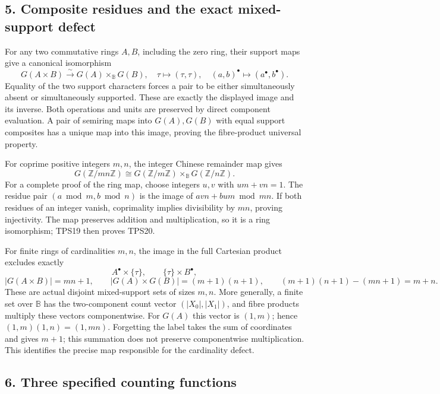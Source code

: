 \documentclass[
  10pt,
]{article}
\begin{document}
\subsection{5. Composite residues and the exact mixed-support
defect}\label{composite-residues-and-the-exact-mixed-support-defect}

For any two commutative rings \(A,B\), including the zero ring, their
support maps give a canonical isomorphism \[
\boxed{G(A\times B)\xrightarrow{\sim}G(A)\times_{\mathbb B}G(B),
\quad \tau\mapsto(\tau,\tau),\quad(a,b)^\bullet\mapsto(a^\bullet,b^\bullet).}
\tag{TPS19}
\] Equality of the two support characters forces a pair to be either
simultaneously absent or simultaneously supported. These are exactly the
displayed image and its inverse. Both operations and units are preserved
by direct component evaluation. A pair of semiring maps into
\(G(A),G(B)\) with equal support composites has a unique map into this
image, proving the fibre-product universal property.

For coprime positive integers \(m,n\), the integer Chinese remainder map
gives \[
\boxed{G(\mathbb Z/mn\mathbb Z)
\cong G(\mathbb Z/m\mathbb Z)\times_{\mathbb B}G(\mathbb Z/n\mathbb Z).}
\tag{TPS20}
\] For a complete proof of the ring map, choose integers \(u,v\) with
\(um+vn=1\). The residue pair \((a\bmod m,b\bmod n)\) is the image of
\(a v n+b u m\bmod mn\). If both residues of an integer vanish,
coprimality implies divisibility by \(mn\), proving injectivity. The map
preserves addition and multiplication, so it is a ring isomorphism;
TPS19 then proves TPS20.

For finite rings of cardinalities \(m,n\), the image in the full
Cartesian product excludes exactly \[
A^\bullet\times\{\tau\},\qquad \{\tau\}\times B^\bullet,
\] \[
|G(A\times B)|=mn+1,\qquad
|G(A)\times G(B)|=(m+1)(n+1),
\qquad (m+1)(n+1)-(mn+1)=m+n.
\tag{TPS21}
\] These are actual disjoint mixed-support sets of sizes \(m,n\). More
generally, a finite set over \(\mathbb B\) has the two-component count
vector \((|X_0|,|X_1|)\), and fibre products multiply these vectors
componentwise. For \(G(A)\) this vector is \((1,m)\); hence
\((1,m)(1,n)=(1,mn)\). Forgetting the label takes the sum of coordinates
and gives \(m+1\); this summation does not preserve componentwise
multiplication. This identifies the precise map responsible for the
cardinality defect.

\subsection{6. Three specified counting
functions}\label{three-specified-counting-functions}
\end{document}
